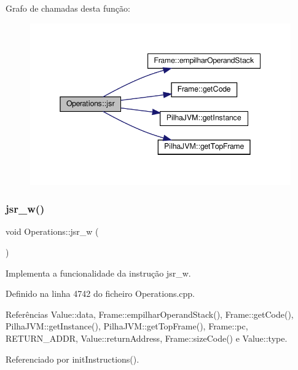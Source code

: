 Grafo de chamadas desta função\+:
\nopagebreak
\begin{figure}[H]
\begin{center}
\leavevmode
\includegraphics[width=345pt]{classOperations_a63c3ab8fef60a8a19ee336cb3d86f9aa_cgraph}
\end{center}
\end{figure}
\mbox{\label{classOperations_a22241dabd3678c4ab77bbe5882c3a4db}} 
\subsubsection{\texorpdfstring{jsr\+\_\+w()}{jsr\_w()}}
{\footnotesize\ttfamily void Operations\+::jsr\+\_\+w (\begin{DoxyParamCaption}{ }\end{DoxyParamCaption})\hspace{0.3cm}{\ttfamily [private]}}



Implementa a funcionalidade da instrução jsr\+\_\+w. 



Definido na linha 4742 do ficheiro Operations.\+cpp.



Referências Value\+::data, Frame\+::empilhar\+Operand\+Stack(), Frame\+::get\+Code(), Pilha\+J\+V\+M\+::get\+Instance(), Pilha\+J\+V\+M\+::get\+Top\+Frame(), Frame\+::pc, R\+E\+T\+U\+R\+N\+\_\+\+A\+D\+DR, Value\+::return\+Address, Frame\+::size\+Code() e Value\+::type.



Referenciado por init\+Instructions().

